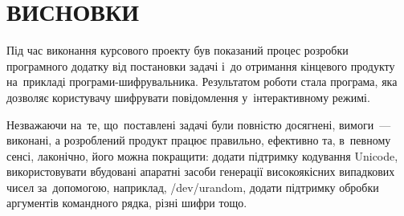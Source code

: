 \documentclass[a4paper,oneside,titlepage,14pt]{extarticle}
\begin{document}
	\section*{ВИСНОВКИ}
		Під час виконання курсового проекту був показаний процес розробки програмного додатку від постановки задачі і~до отримання кінцевого продукту на~прикладі програми-шифрувальника. Результатом роботи стала програма, яка дозволяє користувачу шифрувати повідомлення у~інтерактивному режимі.\par
		Незважаючи на~те, що~поставлені задачі були повністю досягнені, вимоги~--- виконані, а розроблений продукт працює правильно, ефективно та, в~певному сенсі, лаконічно, його можна покращити: додати підтримку кодування Unicode, використовувати вбудовані апаратні засоби генерації високоякісних випадкових чисел за~допомогою, наприклад, /dev/urandom, додати підтримку обробки аргументів командного рядка, різні шифри тощо.\par
	\newpage
	\printbibliography
	\newpage
\end{document}
